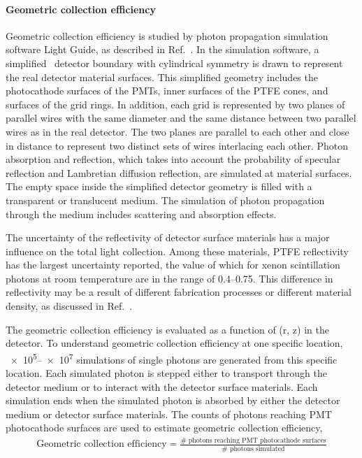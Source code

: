 \paragraph{Geometric collection efficiency} Geometric collection efficiency is studied by photon propagation simulation software Light Guide, as described in Ref.~\cite{Shutt2018}. In the simulation software, a simplified \gtest\ detector boundary with cylindrical symmetry is drawn to represent the real detector material surfaces.  This simplified geometry includes the photocathode surfaces of the PMTs, inner surfaces of the PTFE cones, and surfaces of the grid rings. In addition, each grid is represented by two planes of parallel wires with the same diameter and the same distance between two parallel wires as in the real detector. The two planes are parallel to each other and close in distance to represent two distinct sets of wires interlacing each other.  %
Photon absorption and reflection, which takes into account  the probability of specular reflection and Lambretian diffusion reflection, are simulated at material surfaces. The empty space inside the simplified detector geometry is filled with a transparent or translucent medium. The simulation of photon propagation through the medium includes scattering and absorption effects.

The uncertainty of the reflectivity of detector surface materials has a major influence on the total light collection. Among these materials, PTFE reflectivity has the largest uncertainty reported, the value of which for xenon scintillation photons at room temperature are in the range of \numrange{0.4}{0.75}. This difference in reflectivity may be a result of different fabrication %
processes or different material density, as discussed in Ref.~\cite{Silva2009}.

The geometric collection efficiency is evaluated as a function of (r, z) in the detector. To understand geometric collection efficiency at one specific location, \numrange{e5}{e7} simulations of single photons are generated from this specific location. %
Each simulated photon is stepped either to transport through the detector medium or to interact with the detector surface materials. Each simulation ends when the simulated photon is absorbed by either the detector medium or detector surface materials. The counts of photons reaching PMT photocathode surfaces are used to estimate geometric collection efficiency,  
\begin{align}
	\text{Geometric collection efficiency} = \frac{\text{\#\  photons reaching PMT photocathode surfaces}}{\text{\#\  photons simulated}}
\end{align}

